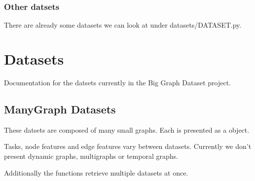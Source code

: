 \documentclass[letterpaper,10pt,english]{sphinxhowto}
\begin{document}
\subsubsection{Other datsets}
\label{\detokenize{reddit-dataset-example:Other-datsets}}
\sphinxAtStartPar
There are already some datasets we can look at under datasets/DATASET.py.


\section{Datasets}
\label{\detokenize{index:datasets}}
\sphinxAtStartPar
Documentation for the datsets currently in the Big Graph Dataset project.

\sphinxstepscope


\subsection{Many\sphinxhyphen{}Graph Datasets}
\label{\detokenize{datasets:many-graph-datasets}}\label{\detokenize{datasets::doc}}
\sphinxAtStartPar
These datsets are composed of many small graphs.
Each is presented as a  object.

\sphinxAtStartPar
Tasks, node features and edge features vary between datasets.
Currently we don’t present dynamic graphs, multi\sphinxhyphen{}graphs or temporal graphs.

\sphinxAtStartPar
Additionally the functions  retrieve multiple datasets at once.
\label{\detokenize{datasets:module-datasets}}
\end{document}
